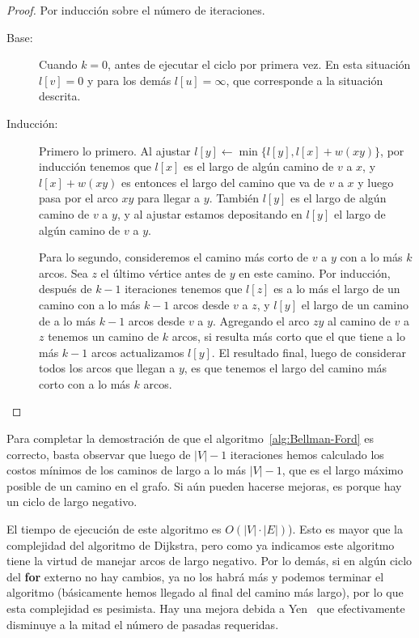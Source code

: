   \begin{proof}
    Por inducción sobre el número de iteraciones.%
    \begin{description}
    \item[Base:]
      Cuando \(k = 0\),
      antes de ejecutar el ciclo por primera vez.
      En esta situación \(l[v] = 0\)
      y para los demás \(l[u] = \infty\),
      que corresponde a la situación descrita.
    \item[Inducción:]
      Primero lo primero.
      Al ajustar
	\(l[y] \leftarrow \min\{l[y], l[x] + w(x y)\}\),
      por inducción tenemos que \(l[x]\)
      es el largo de algún camino de \(v\) a \(x\),
      y \(l[x] + w(x y)\) es entonces el largo del camino
      que va de \(v\) a \(x\) y luego pasa por el arco \(x y\)
      para llegar a \(y\).
      También \(l[y]\) es el largo de algún camino de \(v\) a \(y\),
      y al ajustar
      estamos depositando en \(l[y]\)
      el largo de algún camino de \(v\) a \(y\).

      Para lo segundo,
      consideremos el camino más corto de \(v\) a \(y\)
      con a lo más \(k\) arcos.
      Sea \(z\) el último vértice antes de \(y\) en este camino.
      Por inducción,
      después de \(k - 1\) iteraciones tenemos que \(l[z]\)
      es a lo más el largo de un camino con a lo más \(k - 1\) arcos
      desde \(v\) a \(z\),
      y \(l[y]\) el largo de un camino de a lo más \(k - 1\) arcos
      desde \(v\) a \(y\).
      Agregando el arco \(z y\) al camino de \(v\) a \(z\)
      tenemos un camino de \(k\) arcos,
      si resulta más corto que el que tiene a lo más \(k - 1\) arcos
      actualizamos \(l[y]\).
      El resultado final,
      luego de considerar todos los arcos que llegan a \(y\),
      es que tenemos el largo
      del camino más corto con a lo más \(k\) arcos.
    \qedhere
    \end{description}
  \end{proof}

  Para completar la demostración
  de que el algoritmo~\ref{alg:Bellman-Ford} es correcto,
  basta observar que luego de \(\lvert V \rvert - 1\) iteraciones
  hemos calculado los costos mínimos
  de los caminos de largo a lo más \(\lvert V \rvert - 1\),
  que es el largo máximo posible de un camino en el grafo.
  Si aún pueden hacerse mejoras,
  es porque hay un ciclo de largo negativo.

  El tiempo de ejecución de este algoritmo es
  \(O(\lvert V \rvert \cdot \lvert E \rvert)\)).
  Esto es mayor que la complejidad del algoritmo de Dijkstra,
  pero como ya indicamos
  este algoritmo tiene la virtud de manejar arcos de largo negativo.
  Por lo demás,
  si en algún ciclo del \textbf{for} externo no hay cambios,
  ya no los habrá más y podemos terminar el algoritmo
  (básicamente hemos llegado al final del camino más largo),
  por lo que esta complejidad es pesimista.
  Hay una mejora debida a Yen~%
    \cite{yen70:_algor_findin_short_routes_all}
  que efectivamente disminuye a la mitad el número de pasadas
  requeridas.


